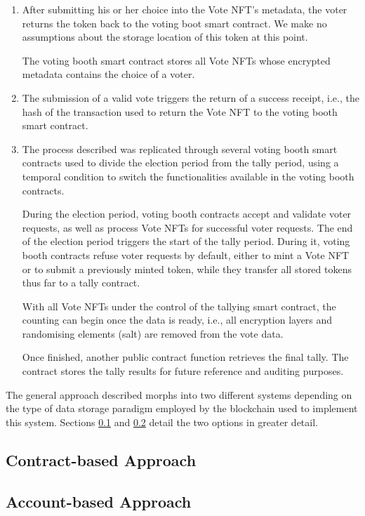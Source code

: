 \documentclass[../main.tex]{subfiles}
\begin{document}
\begin{enumerate}
    \item{After submitting his or her choice into the Vote NFT's metadata, the voter returns the token back to the voting boot smart contract. We make no assumptions about the storage location of this token at this point.
          \par
          The voting booth smart contract stores all Vote NFTs whose encrypted metadata contains the choice of a voter.}

    \item{The submission of a valid vote triggers the return of a success receipt, i.e., the hash of the transaction used to return the Vote NFT to the voting booth smart contract.}

    \item{The process described was replicated through several voting booth smart contracts used to divide the election period from the tally period, using a temporal condition to switch the functionalities available in the voting booth contracts.
          \par
          During the election period, voting booth contracts accept and validate voter requests, as well as process Vote NFTs for successful voter requests. The end of the election period triggers the start of the tally period. During it, voting booth contracts refuse voter requests by default, either to mint a Vote NFT or to submit a previously minted token, while they transfer all stored tokens thus far to a tally contract.
          \par
          With all Vote NFTs under the control of the tallying smart contract, the counting can begin once the data is ready, i.e., all encryption layers and randomising elements (salt) are removed from the vote data.
          \par
          Once finished, another public contract function retrieves the final tally. The contract stores the tally results for future reference and auditing purposes.}
\end{enumerate}

The general approach described morphs into two different systems depending on the type of data storage paradigm employed by the blockchain used to implement this system. Sections \ref{contract-based-approach} and \ref{account-based-approach} detail the two options in greater detail.

\subsection{Contract-based Approach}
\label{contract-based-approach}


\subsection{Account-based Approach}
\label{account-based-approach}

\end{document}
